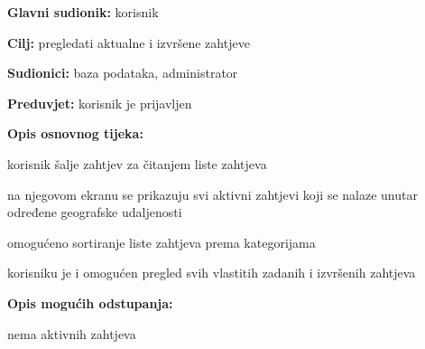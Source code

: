 \noindent {}
\begin{packed_item}
	\item \textbf{Glavni sudionik: }korisnik
	\item  \textbf{Cilj:} pregledati aktualne i izvršene zahtjeve
	\item  \textbf{Sudionici:} baza podataka, administrator
	\item  \textbf{Preduvjet:} korisnik je prijavljen
	\item  \textbf{Opis osnovnog tijeka:}
	
	\item[] \begin{packed_enum}
		
		\item korisnik šalje zahtjev za čitanjem liste zahtjeva
		\item na njegovom ekranu se prikazuju svi aktivni zahtjevi koji se nalaze unutar određene geografske udaljenosti
		\item omogućeno sortiranje liste zahtjeva prema kategorijama
		\item korisniku je i omogućen pregled svih vlastitih zadanih i izvršenih zahtjeva
	\end{packed_enum}
	
	\item  \textbf{Opis mogućih odstupanja:}
	
	\item[] \begin{packed_item}
		
		\item[2.a] nema aktivnih zahtjeva
	\end{packed_item}
\end{packed_item}

